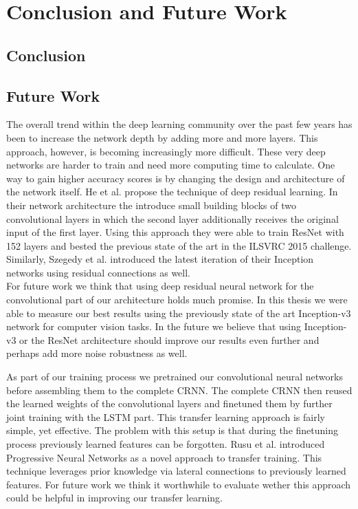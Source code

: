 \section{Conclusion and Future Work}
\label{sec:summary}

\subsection{Conclusion}
\subsection{Future Work}
The overall trend within the deep learning community over the past few years has been to increase the network depth by adding more and more layers. This approach, however, is becoming increasingly more difficult. These very deep networks are harder to train and need more computing time to calculate. One way to gain higher accuracy scores is by changing the design and architecture of the network itself. He et al. propose the technique of deep residual learning\cite{he2016deep}. In their network architecture the introduce small building blocks of two convolutional layers in which the second layer additionally receives the original input of the first layer. \cite{he2016deep} Using this approach they were able to train ResNet with 152 layers and bested the previous state of the art in the ILSVRC 2015 challenge. Similarly, Szegedy et al. introduced the latest iteration of their Inception networks using residual connections\cite{szegedy2016inception} as well.\\
For future work we think that using deep residual neural network for the convolutional part of our architecture holds much promise. In this thesis we were able to measure our best results using the previously state of the art Inception-v3 network for computer vision tasks. In the future we believe that using Inception-v3 or the ResNet architecture should improve our results even further and perhaps add more noise robustness as well.

As part of our training process we pretrained our convolutional neural networks before assembling them to the complete CRNN. The complete CRNN then reused the learned weights of the convolutional layers and finetuned them by further joint training with the LSTM part. This transfer learning approach is fairly simple, yet effective. The problem with this setup is that during the finetuning process previously learned features can be forgotten. Rusu et al. introduced Progressive Neural Networks\cite{rusu2016progressive} as a novel approach to transfer training. This technique leverages prior knowledge via lateral connections to previously learned features. For future work we think it worthwhile to evaluate wether this approach could be helpful in improving our transfer learning.

